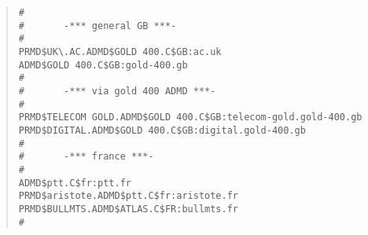 \begin{quote}\small\begin{verbatim}
#
#       -*** general GB ***-
#
PRMD$UK\.AC.ADMD$GOLD 400.C$GB:ac.uk
ADMD$GOLD 400.C$GB:gold-400.gb
#
#       -*** via gold 400 ADMD ***-
#
PRMD$TELECOM GOLD.ADMD$GOLD 400.C$GB:telecom-gold.gold-400.gb
PRMD$DIGITAL.ADMD$GOLD 400.C$GB:digital.gold-400.gb
#
#       -*** france ***-
#
ADMD$ptt.C$fr:ptt.fr
PRMD$aristote.ADMD$ptt.C$fr:aristote.fr
PRMD$BULLMTS.ADMD$ATLAS.C$FR:bullmts.fr
#
\end{verbatim}\end{quote}
